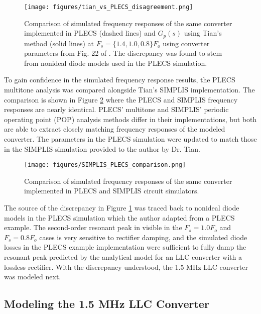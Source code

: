 \documentclass[journal]{IEEEtran}
\begin{document}
\begin{figure}
  \centering
  \texttt{[image: figures/tian\_vs\_PLECS\_disagreement.png]}
  \caption{Comparison of simulated frequency responses of the same converter implemented in PLECS (dashed lines) and $G_p(s)$ using Tian's method (solid lines) at ${F_s=\{1.4, 1.0, 0.8\}F_o}$ using converter parameters from Fig. 22 of \cite{tian_equivalent_2020}. The discrepancy was found to stem from nonideal diode models used in the PLECS simulation.}
  \label{fig:PLECS_Tian_comparison}
\end{figure}

To gain confidence in the simulated frequency response results, the PLECS multitone analysis was compared alongside Tian's SIMPLIS implementation. 
The comparison is shown in Figure \ref{fig:simulation_comparison} where the PLECS and SIMPLIS frequency responses are nearly identical. 
PLECS' multitone and SIMPLIS' periodic operating point (POP) analysis methods differ in their implementations, but both are able to extract closely matching frequency responses of the modeled converter. 
The parameters in the PLECS simulation were updated to match those in the SIMPLIS simulation provided to the author by Dr. Tian.

\begin{figure}
  \centering
  \texttt{[image: figures/SIMPLIS\_PLECS\_comparison.png]}
  \caption{Comparison of simulated frequency responses of the same converter implemented in PLECS and SIMPLIS circuit simulators. }
  \label{fig:simulation_comparison}
\end{figure}

The source of the discrepancy in Figure \ref{fig:PLECS_Tian_comparison} was traced back to nonideal diode models in the PLECS simulation which the author adapted from a PLECS example. 
The second-order resonant peak in visible in the ${F_s=1.0F_o}$ and ${F_s=0.8F_o}$ cases is very sensitive to rectifier damping, and the simulated diode losses in the PLECS example implementation were sufficient to fully damp the resonant peak predicted by the analytical model for an LLC converter with a lossless rectifier.
With the discrepancy understood, the 1.5 MHz LLC converter was modeled next.

\subsection{Modeling the 1.5 MHz LLC Converter}
\label{sec:LLC_converter}
\end{document}
